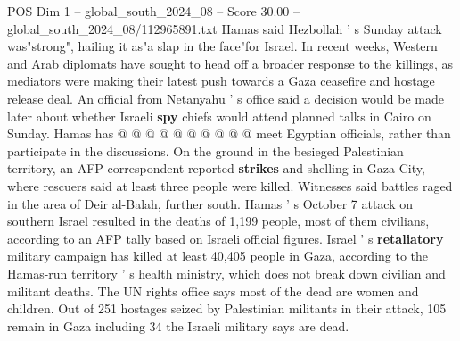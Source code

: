 \begin{textsample}{POS Dim 1 – global\_south\_2024\_08 – Score 30.00 – global\_south\_2024\_08/112965891.txt}
Hamas said Hezbollah ' s Sunday attack was"strong", hailing it as"a slap in the face"for Israel.
In recent weeks, Western and Arab diplomats have sought to head off a broader response to the killings, as mediators were making their latest push towards a Gaza ceasefire and hostage release deal.
An official from Netanyahu ' s office said a decision would be made later about whether Israeli \textbf{spy} chiefs would attend planned talks in Cairo on Sunday.
Hamas has @ @ @ @ @ @ @ @ @ @ meet Egyptian officials, rather than participate in the discussions.
On the ground in the besieged Palestinian territory, an AFP correspondent reported \textbf{strikes} and shelling in Gaza City, where rescuers said at least three people were killed.
Witnesses said battles raged in the area of Deir al-Balah, further south.
Hamas ' s October 7 attack on southern Israel resulted in the deaths of 1,199 people, most of them civilians, according to an AFP tally based on Israeli official figures.
Israel ' s \textbf{retaliatory} military campaign has killed at least 40,405 people in Gaza, according to the Hamas-run territory ' s health ministry, which does not break down civilian and militant deaths.
The UN rights office says most of the dead are women and children.
Out of 251 hostages seized by Palestinian militants in their attack, 105 remain in Gaza including 34 the Israeli military says are dead.

\end{textsample}
